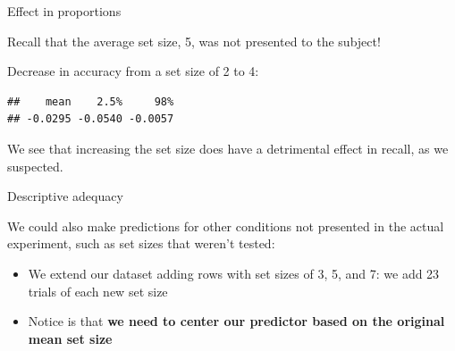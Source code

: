 \documentclass[12pt,ignorenonframetext,aspectratio=169]{beamer}
\newenvironment{Shaded}{\begin{snugshade}}{\end{snugshade}}
\newcommand{\DataTypeTok}[1]{\textcolor[rgb]{0.13,0.29,0.53}{#1}}
\newcommand{\DecValTok}[1]{\textcolor[rgb]{0.00,0.00,0.81}{#1}}
\newcommand{\FloatTok}[1]{\textcolor[rgb]{0.00,0.00,0.81}{#1}}
\newcommand{\KeywordTok}[1]{\textcolor[rgb]{0.13,0.29,0.53}{\textbf{#1}}}
\newcommand{\NormalTok}[1]{#1}
\newcommand{\OperatorTok}[1]{\textcolor[rgb]{0.81,0.36,0.00}{\textbf{#1}}}
\newcommand{\StringTok}[1]{\textcolor[rgb]{0.31,0.60,0.02}{#1}}
\begin{document}
\begin{frame}[fragile]{Effect in proportions}
\protect\hypertarget{effect-in-proportions-2}{}

Recall that the average set size, 5, was not presented to the subject!

Decrease in accuracy from a set size of 2 to 4:

\scriptsize

\begin{Shaded}
\end{Shaded}

\begin{verbatim}
##    mean    2.5%     98% 
## -0.0295 -0.0540 -0.0057
\end{verbatim}

\normalsize

We see that increasing the set size does have a detrimental effect in recall, as we suspected.

\end{frame}

\begin{frame}{Descriptive adequacy}
\protect\hypertarget{descriptive-adequacy}{}

We could also make predictions for other conditions not presented in the actual experiment, such as set sizes that weren't tested:

\begin{itemize}
\item
  We extend our dataset adding rows with set sizes of 3, 5, and 7: we add 23 trials of each new set size
\item
  Notice is that \textbf{we need to center our predictor based on the original mean set size}
\end{itemize}

\end{frame}
\end{document}

